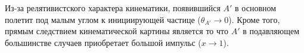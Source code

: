 



Из-за релятивистского характера кинематики, появившийся $A'$ в основном полетит
под малым углом к инициирующей частице ($\theta_{A'} \rightarrow 0$). Кроме
того, прямым следствием кинематической картины является то что $A'$ в подавляющем
большинстве случаев приобретает большой импульс ($x \rightarrow 1$).


